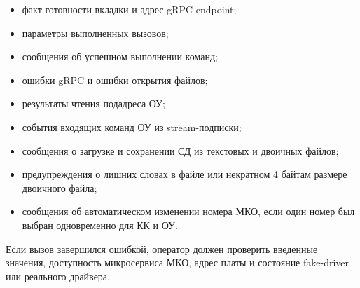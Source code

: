 \begin{itemize}
	\item факт готовности вкладки и адрес gRPC endpoint;
	\item параметры выполненных вызовов;
	\item сообщения об успешном выполнении команд;
	\item ошибки gRPC и ошибки открытия файлов;
	\item результаты чтения подадреса ОУ;
	\item события входящих команд ОУ из stream-подписки;
	\item сообщения о загрузке и сохранении СД из текстовых и двоичных файлов;
	\item предупреждения о лишних словах в файле или некратном 4 байтам размере двоичного файла;
	\item сообщения об автоматическом изменении номера МКО, если один номер был выбран одновременно для КК и ОУ.
\end{itemize}

Если вызов завершился ошибкой, оператор должен проверить введенные значения, доступность микросервиса МКО, адрес платы и состояние fake-driver или реального драйвера.

